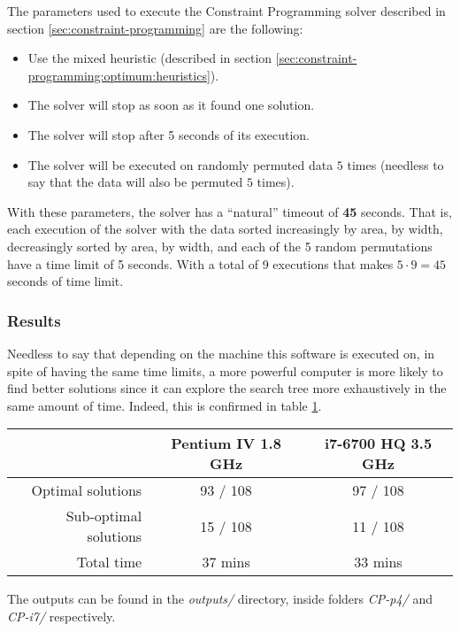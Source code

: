 The parameters used to execute the Constraint Programming solver described in section
\ref{sec:constraint-programming} are the following:
\begin{itemize}
	\item Use the mixed heuristic (described in section \ref{sec:constraint-programming:optimum:heuristics}).
	\item The solver will stop as soon as it found one solution.
	\item The solver will stop after 5 seconds of its execution.
	\item The solver will be executed on randomly permuted data $5$ times (needless to
	say that the data will also be permuted $5$ times).
\end{itemize}

With these parameters, the solver has a ``natural'' timeout of \textbf{45} seconds.
That is, each execution of the solver with the data sorted increasingly by area, by
width, decreasingly sorted by area, by width, and each of the 5 random permutations
have a time limit of 5 seconds. With a total of 9 executions that makes $5 \cdot 9 = 45$
seconds of time limit.

\subsubsection{Results}
\label{sec:benchmarking:constraint-programming:results}

Needless to say that depending on the machine this software is executed on,
in spite of having the same time limits, a more powerful computer is more likely
to find better solutions since it can explore the search tree more exhaustively
in the same amount of time. Indeed, this is confirmed in table \ref{table:CP-results}.

\begin{table}[H]
\centering
	\begin{tabular}{rcc}
								& Pentium IV 1.8 GHz & i7-6700 HQ 3.5 GHz \\
		\midrule
		Optimal solutions		& 93 / 108			 & 97 / 108 \\
		Sub-optimal solutions	& 15 / 108			 & 11 / 108 \\
		Total time				& 37 mins			 & 33 mins \\
	\end{tabular}
	\label{table:CP-results}
\end{table}

The outputs can be found in the \textit{outputs/} directory, inside folders
\textit{CP-p4/} and \textit{CP-i7/} respectively.